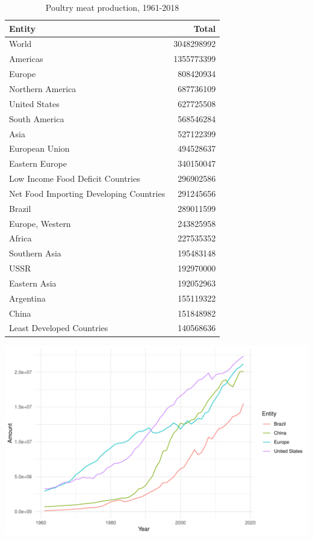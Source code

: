 \documentclass[11pt,a4paper,]{article}
\begin{document}
\begin{table}

\caption{\label{tab:poultry}Poultry meat production, 1961-2018}
\centering
\begin{tabular}[t]{lr}
\toprule
Entity & Total\\
\midrule
World & 3048298992\\
Americas & 1355773399\\
Europe & 808420934\\
Northern America & 687736109\\
United States & 627725508\\
\addlinespace
South America & 568546284\\
Asia & 527122399\\
European Union & 494528637\\
Eastern Europe & 340150047\\
Low Income Food Deficit Countries & 296902586\\
\addlinespace
Net Food Importing Developing Countries & 291245656\\
Brazil & 289011599\\
Europe, Western & 243825958\\
Africa & 227535352\\
Southern Asia & 195483148\\
\addlinespace
USSR & 192970000\\
Eastern Asia & 192052963\\
Argentina & 155119322\\
China & 151848982\\
Least Developed Countries & 140568636\\
\bottomrule
\end{tabular}
\end{table}

\includegraphics{report_files/figure-latex/poultry-1.pdf}
\end{document}
